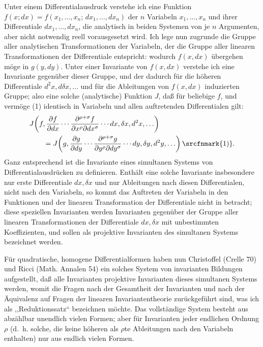 Unter einem Differentialausdruck verstehe ich eine Funktion
\(f(x;dx)=f(x_1,\ldots,x_n;\,dx_1,\ldots,dx_n)\) der \(n\)
Variabeln \(x_1,\ldots,x_n\) und ihrer Differentiale
\(dx_1,\ldots,dx_n\), die analytisch in beiden Systemen von je
\(n\) Argumenten, aber nicht notwendig reell vorausgesetzt wird.
Ich lege nun zugrunde die Gruppe aller analytischen Transformationen
der Variabeln, der die Gruppe aller linearen Transformationen der
Differentiale entspricht:
wodurch \(f(x,dx)\) übergehen möge in \(g(y,dy)\). Unter einer
Invariante von \(f(x,dx)\) verstehe ich eine Invariante gegenüber
dieser Gruppe, und der dadurch für die höheren Differentiale
\(d^2x,d\delta x,\ldots\) und für die Ableitungen von \(f(x,dx)\)
induzierten Gruppe; also eine solche (analytische) Funktion \(J\),
daß für beliebige \(f\), und vermöge (1) identisch in Variabeln und
allen auftretenden Differentialen gilt:
\[
\begin{aligned}
&J\!\left(f,\frac{\partial f}{\partial dx}\cdots
\frac{\partial^{\rho+\sigma}f}{\partial x^\rho\partial dx^\sigma}
\cdots dx,\delta x,d^2x,\ldots\right)\\
&\qquad =
J\!\left(g,\frac{\partial g}{\partial dy}\cdots
\frac{\partial^{\rho+\sigma}g}{\partial y^\rho\partial dy^\sigma}
\cdots dy,\delta y,d^2y,\ldots\right)\srcfnmark{1)}.
\end{aligned}
\]
Ganz entsprechend ist die Invariante eines simultanen Systems von
Differentialausdrücken zu definieren. Enthält eine solche Invariante
insbesondere nur erste Differentiale \(dx,\delta x\) und nur Ableitungen
nach diesen Differentialen, nicht nach den Variabeln, so kommt das
Auftreten der Variabeln in den Funktionen und der linearen
Transformation der Differentiale nicht in betracht; diese speziellen
Invarianten werden Invarianten gegenüber der Gruppe aller linearen
Transformationen der Differentiale \(dx,\delta x\) mit unbestimmten
Koeffizienten, und sollen als projektive Invarianten des simultanen
Systems bezeichnet werden.

Für quadratische, homogene Differentialformen haben nun Christoffel
(Crelle 70) und Ricci (Math. Annalen 54) ein solches System von
invarianten Bildungen aufgestellt, daß alle Invarianten projektive
Invarianten dieses simultanen Systems werden, womit die Fragen nach
der Gesamtheit der Invarianten und nach der Äquivalenz auf Fragen der
linearen Invariantentheorie zurückgeführt sind, was ich als
,,Reduktionssatz`` bezeichnen möchte. Das vollständige System besteht
aus abzählbar unendlich vielen Formen; aber für Invarianten jeder
endlichen Ordnung \(\rho\) (d.~h. solche, die keine höheren als
\(\rho\)te Ableitungen nach den Variabeln enthalten) nur aus endlich
vielen Formen.

